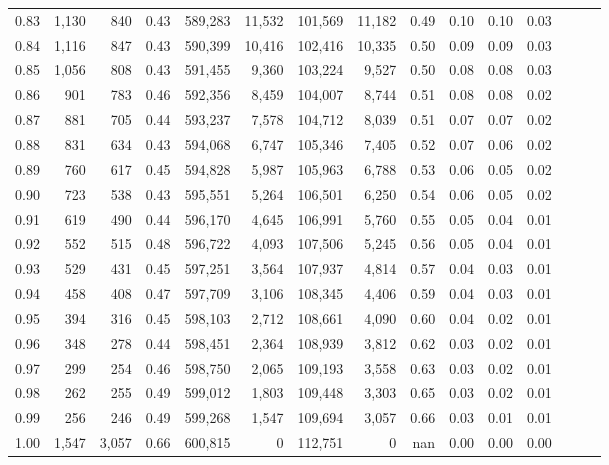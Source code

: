 \begin{tabular}{rrrrrrrrrrrrrrr}
0.83 &   1,130 &    840 &  0.43 &  589,283 &   11,532 &  101,569 &   11,182 &  0.49 &  0.10 &  0.10 &      0.03 \\
0.84 &   1,116 &    847 &  0.43 &  590,399 &   10,416 &  102,416 &   10,335 &  0.50 &  0.09 &  0.09 &      0.03 \\
0.85 &   1,056 &    808 &  0.43 &  591,455 &    9,360 &  103,224 &    9,527 &  0.50 &  0.08 &  0.08 &      0.03 \\
0.86 &     901 &    783 &  0.46 &  592,356 &    8,459 &  104,007 &    8,744 &  0.51 &  0.08 &  0.08 &      0.02 \\
0.87 &     881 &    705 &  0.44 &  593,237 &    7,578 &  104,712 &    8,039 &  0.51 &  0.07 &  0.07 &      0.02 \\
0.88 &     831 &    634 &  0.43 &  594,068 &    6,747 &  105,346 &    7,405 &  0.52 &  0.07 &  0.06 &      0.02 \\
0.89 &     760 &    617 &  0.45 &  594,828 &    5,987 &  105,963 &    6,788 &  0.53 &  0.06 &  0.05 &      0.02 \\
0.90 &     723 &    538 &  0.43 &  595,551 &    5,264 &  106,501 &    6,250 &  0.54 &  0.06 &  0.05 &      0.02 \\
0.91 &     619 &    490 &  0.44 &  596,170 &    4,645 &  106,991 &    5,760 &  0.55 &  0.05 &  0.04 &      0.01 \\
0.92 &     552 &    515 &  0.48 &  596,722 &    4,093 &  107,506 &    5,245 &  0.56 &  0.05 &  0.04 &      0.01 \\
0.93 &     529 &    431 &  0.45 &  597,251 &    3,564 &  107,937 &    4,814 &  0.57 &  0.04 &  0.03 &      0.01 \\
0.94 &     458 &    408 &  0.47 &  597,709 &    3,106 &  108,345 &    4,406 &  0.59 &  0.04 &  0.03 &      0.01 \\
0.95 &     394 &    316 &  0.45 &  598,103 &    2,712 &  108,661 &    4,090 &  0.60 &  0.04 &  0.02 &      0.01 \\
0.96 &     348 &    278 &  0.44 &  598,451 &    2,364 &  108,939 &    3,812 &  0.62 &  0.03 &  0.02 &      0.01 \\
0.97 &     299 &    254 &  0.46 &  598,750 &    2,065 &  109,193 &    3,558 &  0.63 &  0.03 &  0.02 &      0.01 \\
0.98 &     262 &    255 &  0.49 &  599,012 &    1,803 &  109,448 &    3,303 &  0.65 &  0.03 &  0.02 &      0.01 \\
0.99 &     256 &    246 &  0.49 &  599,268 &    1,547 &  109,694 &    3,057 &  0.66 &  0.03 &  0.01 &      0.01 \\
1.00 &   1,547 &  3,057 &  0.66 &  600,815 &        0 &  112,751 &        0 &   nan &  0.00 &  0.00 &      0.00 \\
\bottomrule
\end{tabular}
